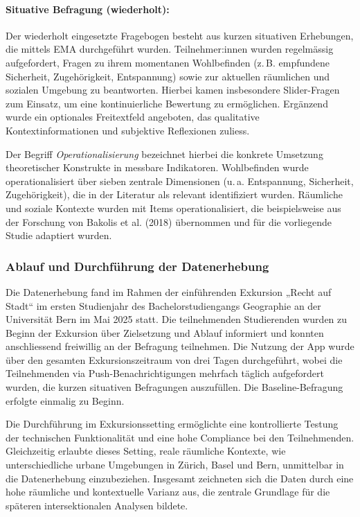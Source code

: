 \paragraph{Situative Befragung (wiederholt):}
Der wiederholt eingesetzte Fragebogen besteht aus kurzen situativen Erhebungen, die mittels EMA durchgeführt wurden. Teilnehmer:innen wurden regelmässig aufgefordert, Fragen zu ihrem momentanen Wohlbefinden (z.\,B. empfundene Sicherheit, Zugehörigkeit, Entspannung) sowie zur aktuellen räumlichen und sozialen Umgebung zu beantworten. Hierbei kamen insbesondere Slider-Fragen zum Einsatz, um eine kontinuierliche Bewertung zu ermöglichen. Ergänzend wurde ein optionales Freitextfeld angeboten, das qualitative Kontextinformationen und subjektive Reflexionen zuliess.

Der Begriff \emph{Operationalisierung} bezeichnet hierbei die konkrete Umsetzung theoretischer Konstrukte in messbare Indikatoren. Wohlbefinden wurde operationalisiert über sieben zentrale Dimensionen (u.\,a. Entspannung, Sicherheit, Zugehörigkeit), die in der Literatur als relevant identifiziert wurden. Räumliche und soziale Kontexte wurden mit Items operationalisiert, die beispielsweise aus der Forschung von Bakolis et al. (2018) übernommen und für die vorliegende Studie adaptiert wurden.

\subsubsection{Ablauf und Durchführung der Datenerhebung}

Die Datenerhebung fand im Rahmen der einführenden Exkursion „Recht auf Stadt“ im ersten Studienjahr des Bachelorstudiengangs Geographie an der Universität Bern im Mai 2025 statt. Die teilnehmenden Studierenden wurden zu Beginn der Exkursion über Zielsetzung und Ablauf informiert und konnten anschliessend freiwillig an der Befragung teilnehmen. Die Nutzung der App wurde über den gesamten Exkursionszeitraum von drei Tagen durchgeführt, wobei die Teilnehmenden via Push-Benachrichtigungen mehrfach täglich aufgefordert wurden, die kurzen situativen Befragungen auszufüllen. Die Baseline-Befragung erfolgte einmalig zu Beginn.

Die Durchführung im Exkursionssetting ermöglichte eine kontrollierte Testung der technischen Funktionalität und eine hohe Compliance bei den Teilnehmenden. Gleichzeitig erlaubte dieses Setting, reale räumliche Kontexte, wie unterschiedliche urbane Umgebungen in Zürich, Basel und Bern, unmittelbar in die Datenerhebung einzubeziehen. Insgesamt zeichneten sich die Daten durch eine hohe räumliche und kontextuelle Varianz aus, die zentrale Grundlage für die späteren intersektionalen Analysen bildete.

